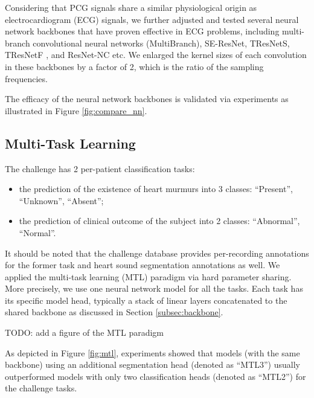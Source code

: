 


Considering that PCG signals share a similar physiological origin as electrocardiogram (ECG) signals, we further adjusted and tested several neural network backbones that have proven effective in ECG problems, including multi-branch convolutional neural networks (MultiBranch), SE-ResNet, TResNetS, TResNetF \cite{Kang_2022_cinc2021_iop}, and ResNet-NC \cite{ribeiro2020automatic} etc. We enlarged the kernel sizes of each convolution in these backbones by a factor of 2, which is the ratio of the sampling frequencies.

The efficacy of the neural network backbones is validated via experiments as illustrated in Figure \ref{fig:compare_nn}.



\subsection{Multi-Task Learning}
\label{subsec:mtl}

The challenge \cite{cinc2022} has 2 per-patient classification tasks:
\begin{itemize}
    \item the prediction of the existence of heart murmurs into 3 classes: ``Present'', ``Unknown'', ``Absent'';
    \item the prediction of clinical outcome of the subject into 2 classes: ``Abnormal'', ``Normal''.
\end{itemize}

It should be noted that the challenge database \cite{Oliveira_2021_CirCor} provides per-recording annotations for the former task and heart sound segmentation annotations as well. We applied the multi-task learning (MTL) paradigm \cite{Caruana_1997_mtl} via hard parameter sharing. More precisely, we use one neural network model for all the tasks. Each task has its specific model head, typically a stack of linear layers concatenated to the shared backbone as discussed in Section \ref{subsec:backbone}.

TODO: add a figure of the MTL paradigm



As depicted in Figure \ref{fig:mtl}, experiments showed that models (with the same backbone) using an additional segmentation head (denoted as ``MTL3'') usually outperformed models with only two classification heads (denoted as ``MTL2'') for the challenge tasks.

